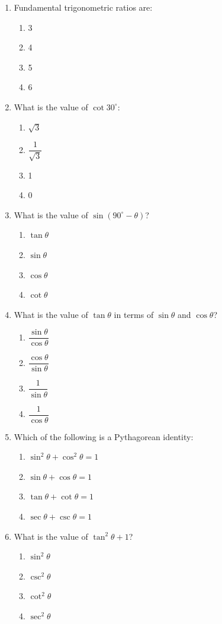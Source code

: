 \documentclass[11pt]{article}
\begin{document}
\begin{enumerate}[label=\textbf{\arabic*.}, start=204, leftmargin=2em]
\item Fundamental trigonometric ratios are:
\begin{enumerate}[label=(\Alph*)] \item 3 \item 4 \item 5 \item 6 \end{enumerate}

\item What is the value of $\cot 30^\circ$:
\begin{enumerate}[label=(\Alph*)] \item $\sqrt{3}$ \item $\dfrac{1}{\sqrt{3}}$ \item 1 \item 0 \end{enumerate}

\item What is the value of $\sin(90^\circ - \theta)$?
\begin{enumerate}[label=(\Alph*)] \item $\tan\theta$ \item $\sin\theta$ \item $\cos\theta$ \item $\cot\theta$ \end{enumerate}

\item What is the value of $\tan\theta$ in terms of $\sin\theta$ and $\cos\theta$?
\begin{enumerate}[label=(\Alph*)] \item $\dfrac{\sin\theta}{\cos\theta}$ \item $\dfrac{\cos\theta}{\sin\theta}$ \item $\dfrac{1}{\sin\theta}$ \item $\dfrac{1}{\cos\theta}$ \end{enumerate}

\item Which of the following is a Pythagorean identity:
\begin{enumerate}[label=(\Alph*)] \item $\sin^2\theta+\cos^2\theta=1$ \item $\sin\theta+\cos\theta=1$ \item $\tan\theta+\cot\theta=1$ \item $\sec\theta+\csc\theta=1$ \end{enumerate}

\item What is the value of $\tan^2\theta + 1$?
\begin{enumerate}[label=(\Alph*)] \item $\sin^2\theta$ \item $\csc^2\theta$ \item $\cot^2\theta$ \item $\sec^2\theta$ \end{enumerate}


\end{enumerate}
\end{document}
